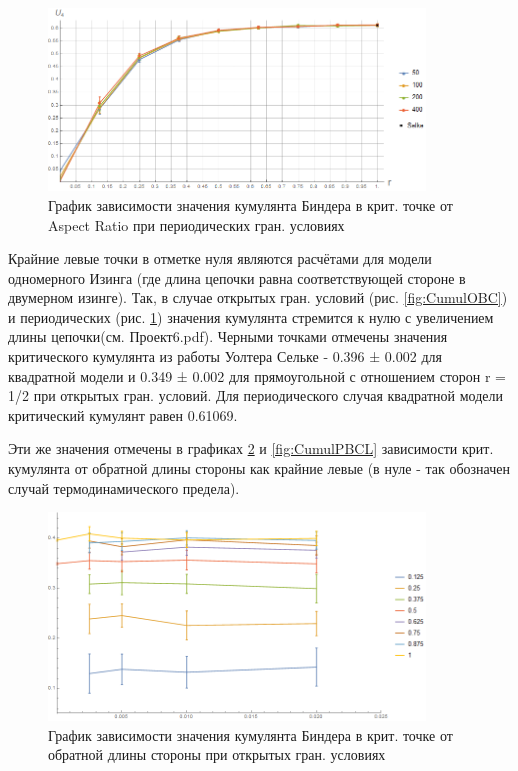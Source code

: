 \begin{figure}[!h]
    \centering
    \includegraphics[width=100mm]{Sections/Images/CumulantPBC.png}
    \caption{График зависимости значения кумулянта Биндера в крит. точке от Aspect Ratio при периодических гран. условиях}
    \label{fig:CumulPBC}
\end{figure}

Крайние левые точки в отметке нуля являются расчётами для модели одномерного Изинга (где длина цепочки равна соответствующей стороне в двумерном изинге). Так, в случае открытых гран. условий (рис. \ref{fig:CumulOBC}) и периодических (рис. \ref{fig:CumulPBC}) значения кумулянта стремится к нулю с увеличением длины цепочки(см. Проект6.pdf\cite{Git}).
Черными точками отмечены значения критического кумулянта из работы Уолтера Сельке - 0.396 ± 0.002 для квадратной модели и 0.349 ± 0.002 для прямоугольной с отношением сторон r = 1/2 при открытых гран. условий. Для периодического случая квадратной модели критический кумулянт равен 0.61069\cite{Selke}.

Эти же значения отмечены в графиках \ref{fig:CumulOBCL} и \ref{fig:CumulPBCL} зависимости крит. кумулянта от обратной длины стороны как крайние левые (в нуле - так обозначен случай термодинамического предела).

\begin{figure}[!h]
    \centering
    \includegraphics[width=100mm]{Sections/Images/CumulantOBCL.png}
    \caption{График зависимости значения кумулянта Биндера в крит. точке от обратной длины стороны при открытых гран. условиях}
    \label{fig:CumulOBCL}
\end{figure}

